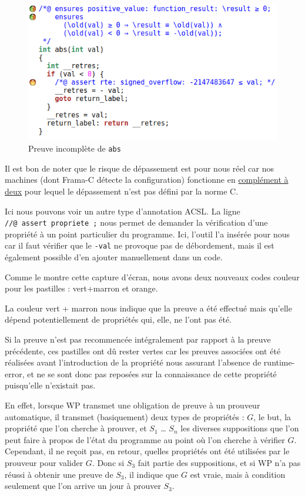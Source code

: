 \documentclass[12pt,francais,]{scrbook}
\newenvironment{zdsblock}[1]{%
  \tcolorbox[beamer,%
    noparskip,breakable,
    colback=LightBlue,colframe=DarkBlue,%
    colbacklower=DarkBlue,%
    title=#1]
}{\endtcolorbox}
\begin{document}
\begin{figure}[htbp]
\centering
\includegraphics[scale=0.5]{2-1-1-abs-4.png}
\caption{Preuve incomplète de \texttt{abs}}
\label{fig:2-1-1-abs-4}
\end{figure}

\begin{zdsblock}{Information}
  Il est bon de noter que le risque de
  dépassement est pour nous réel car nos machines (dont Frama-C
  détecte la configuration) fonctionne en
  \href{https://fr.wikipedia.org/wiki/Compl\%C3\%A9ment_\%C3\%A0_deux}{complément
à deux} pour lequel le dépassement n'est pas défini par la norme C.
\end{zdsblock}

Ici nous pouvons voir un autre type d'annotation ACSL. La ligne
\texttt{//@\ assert\ propriete\ ;} nous permet de demander la
vérification d'une propriété à un point particulier du programme. Ici,
l'outil l'a insérée pour nous car il faut vérifier que le \texttt{-val}
ne provoque pas de débordement, mais il est également possible d'en
ajouter manuellement dans un code.

Comme le montre cette capture d'écran, nous avons deux nouveaux codes
couleur pour les pastilles : vert+marron et orange.

La couleur vert + marron nous indique que la preuve a été effectué mais
qu'elle dépend potentiellement de propriétés qui, elle, ne l'ont pas
été.

Si la preuve n'est pas recommencée intégralement par rapport à la preuve
précédente, ces pastilles ont dû rester vertes car les preuves associées
ont été réalisées avant l'introduction de la propriété nous assurant
l'absence de runtime-error, et ne se sont donc pas reposées sur la
connaissance de cette propriété puisqu'elle n'existait pas.

En effet, lorsque WP transmet une obligation de preuve à un prouveur
automatique, il transmet (basiquement) deux types de propriétés : \(G\),
le but, la propriété que l'on cherche à prouver, et \(S_1\) \ldots{}
\(S_n\) les diverses suppositions que l'on peut faire à propos de l'état
du programme au point où l'on cherche à vérifier \(G\). Cependant, il ne
reçoit pas, en retour, quelles propriétés ont été utilisées par le
prouveur pour valider \(G\). Donc si \(S_3\) fait partie des
suppositions, et si WP n'a pas réussi à obtenir une preuve de \(S_3\),
il indique que \(G\) est vraie, mais à condition seulement que l'on
arrive un jour à prouver \(S_3\).
\end{document}
